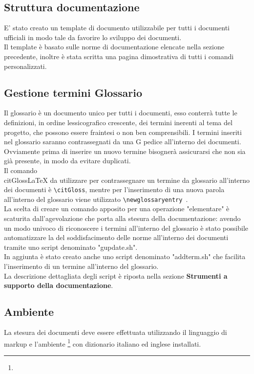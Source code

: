\documentclass[NormeDiProgetto.tex]{subfiles}
\begin{document}
	\subsection{Struttura documentazione}
	E' stato creato un template di documento utilizzabile per tutti i documenti ufficiali in modo tale da favorire lo sviluppo dei documenti.\\
	Il template è basato sulle norme di documentazione elencate nella sezione precedente, inoltre è stata scritta una pagina dimostrativa di tutti i comandi personalizzati.
	
	\subsection{Gestione termini Glossario}
	Il glossario è un documento unico per tutti i documenti, esso conterrà tutte le definizioni, in ordine lessicografico crescente, dei termini inerenti al tema del progetto, che possono essere fraintesi o non ben comprensibili. I termini inseriti nel glossario saranno contrassegnati da una G pedice all'interno dei documenti.\\
	Ovviamente prima di inserire un nuovo termine bisognerà assicurarsi che non sia già presente, in modo da evitare duplicati. \\
	Il comando \\citGloss{LaTeX}{} da utilizzare per contrassegnare un termine da glossario all'interno dei documenti è \texttt{\textbackslash{}citGloss}, mentre per l'inserimento di una nuova parola all'interno del glossario viene utilizzato \texttt{\textbackslash{}newglossaryentry }.\\
	La scelta di creare un comando apposito per una operazione "elementare" è scaturita dall'agevolazione che porta alla stesura della documentazione: avendo un modo univoco di riconoscere i termini all'interno del glossario è stato possibile automatizzare la  del soddisfacimento delle norme all'interno dei documenti tramite uno script denominato "gupdate.sh".\\
	In aggiunta è stato creato anche uno script denominato "addterm.sh" che facilita l'inserimento di un termine all'interno del glossario.\\
	La descrizione dettagliata degli script è riposta nella sezione \textbf{Strumenti a supporto della documentazione}.
	
	
	\subsection{Ambiente}
	La stesura dei documenti deve essere effettuata utilizzando il linguaggio di markup   e l'ambiente \footnote{} con dizionario italiano ed inglese installati.
	
\end{document}
